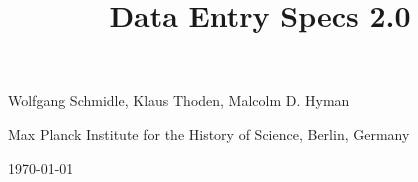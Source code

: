 \documentclass[fontsize=11pt, paper=a4, 
twoside, %
DIV15,
normalheadings,
parskip=half-, 
pointlessnumbers]{scrartcl}
\begin{document}
\title{Data Entry Specs 2.0}
\date{}
\maketitle
\vspace{-20mm}

\begin{center}
\large Wolfgang Schmidle, Klaus Thoden, Malcolm D. Hyman

\normalsize Max Planck Institute for the History of Science, Berlin, Germany

\today
\end{center}

\tableofcontents
\newpage



% 
\end{document}
